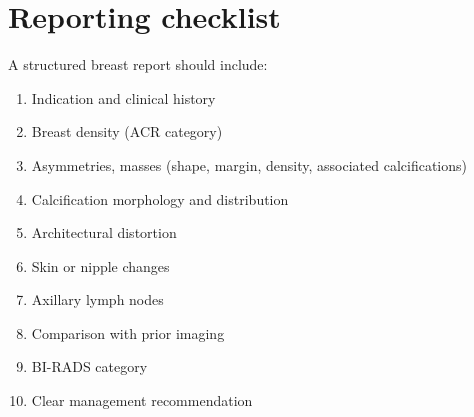 \section{Reporting checklist}
A structured breast report should include:
\begin{enumerate}
    \item Indication and clinical history
    \item Breast density (ACR category)
    \item Asymmetries, masses (shape, margin, density, associated calcifications)
    \item Calcification morphology and distribution
    \item Architectural distortion
    \item Skin or nipple changes
    \item Axillary lymph nodes
    \item Comparison with prior imaging
    \item BI-RADS category
    \item Clear management recommendation
\end{enumerate}

\clearpage
